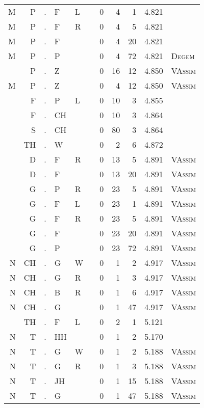 \begin{longtable}{r@{ } r@{ } c@{ } l@{ } l@{ } l@{ } r r r r l }
M & P & . & F & L &   & 0 & 4 & 1 & 4.821 &  \\
M & P & . & F & R &   & 0 & 4 & 5 & 4.821 &  \\
M & P & . & F &   &   & 0 & 4 & 20 & 4.821 &  \\
M & P & . & P &   &   & 0 & 4 & 72 & 4.821 & \textsc{Degem} \\
  & P & . & Z &   &   & 0 & 16 & 12 & 4.850 & \textsc{VAssim} \\
M & P & . & Z &   &   & 0 & 4 & 12 & 4.850 & \textsc{VAssim} \\
  & F & . & P & L &   & 0 & 10 & 3 & 4.855 &  \\
  & F & . & CH &   &   & 0 & 10 & 3 & 4.864 &  \\
  & S & . & CH &   &   & 0 & 80 & 3 & 4.864 &  \\
  & TH & . & W &   &   & 0 & 2 & 6 & 4.872 &  \\
  & D & . & F & R &   & 0 & 13 & 5 & 4.891 & \textsc{VAssim} \\
  & D & . & F &   &   & 0 & 13 & 20 & 4.891 & \textsc{VAssim} \\
  & G & . & P & R &   & 0 & 23 & 5 & 4.891 & \textsc{VAssim} \\
  & G & . & F & L &   & 0 & 23 & 1 & 4.891 & \textsc{VAssim} \\
  & G & . & F & R &   & 0 & 23 & 5 & 4.891 & \textsc{VAssim} \\
  & G & . & F &   &   & 0 & 23 & 20 & 4.891 & \textsc{VAssim} \\
  & G & . & P &   &   & 0 & 23 & 72 & 4.891 & \textsc{VAssim} \\
N & CH & . & G & W &   & 0 & 1 & 2 & 4.917 & \textsc{VAssim} \\
N & CH & . & G & R &   & 0 & 1 & 3 & 4.917 & \textsc{VAssim} \\
N & CH & . & B & R &   & 0 & 1 & 6 & 4.917 & \textsc{VAssim} \\
N & CH & . & G &   &   & 0 & 1 & 47 & 4.917 & \textsc{VAssim} \\
  & TH & . & F & L &   & 0 & 2 & 1 & 5.121 &  \\
N & T & . & HH &   &   & 0 & 1 & 2 & 5.170 &  \\
N & T & . & G & W &   & 0 & 1 & 2 & 5.188 & \textsc{VAssim} \\
N & T & . & G & R &   & 0 & 1 & 3 & 5.188 & \textsc{VAssim} \\
N & T & . & JH &   &   & 0 & 1 & 15 & 5.188 & \textsc{VAssim} \\
N & T & . & G &   &   & 0 & 1 & 47 & 5.188 & \textsc{VAssim} \\

\end{longtable}
